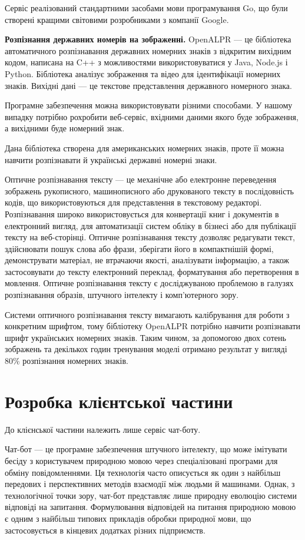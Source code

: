 Сервіс реалізований стандартними засобами мови програмування Go,
що були створені кращими світовими розробниками з компанії Google.

\textbf{Розпізнання державних номерів на зображенні.}
OpenALPR — це бібліотека автоматичного розпізнавання
державних номерних знаків з відкритим вихідним кодом,
написана на C++ з можливостями використовуватися у Java, Node.js і Python.
Бібліотека аналізує зображення та відео для ідентифікації номерних знаків.
Вихідні дані — це текстове представлення державного номерного знака.

Програмне забезпечення можна використовувати різними способами.
У нашому випадку потрібно рохробити веб-сервіс, вхідними даними якого буде зображення, а
вихідними буде номерний знак.

Дана бібліотека створена для американських номерних знаків,
проте її можна навчити розпізнавати й українські державні номерні знаки.

Оптичне розпізнавання тексту — це механічне або електронне переведення
зображень рукописного, машинописного або друкованого тексту в послідовність
кодів, що використовуються для представлення в текстовому редакторі.
Розпізнавання широко використовується для конвертації книг і документів
в електронний вигляд, для автоматизації систем обліку в бізнесі або
для публікації тексту на веб-сторінці.
Оптичне розпізнавання тексту дозволяє редагувати текст,
здійснювати пошук слова або фрази, зберігати його в компактнішій формі,
демонструвати матеріал, не втрачаючи якості,
аналізувати інформацію, а також застосовувати до тексту електронний переклад,
форматування або перетворення в мовлення.
Оптичне розпізнавання тексту є досліджуваною проблемою в галузях розпізнавання образів,
штучного інтелекту і комп'ютерного зору.

Системи оптичного розпізнавання тексту вимагають калібрування для
роботи з конкретним шрифтом, тому бібліотеку OpenALPR потрібно
навчити розпізнавати шрифт українських номерних знаків.
Таким чином, за допомогою двох сотень зображень та декількох
годин тренування моделі отримано результат у вигляді 80\%
розпізнання номерних знаків.

\section{Розробка клієнтської частини}

До клієнської частини належить лише сервіс чат-боту.

Чат-бот — це програмне забезпечення штучного інтелекту, що може імітувати бесіду з користувачем природною мовою через спеціалізовані програми для обміну повідомленнями.
Ця технологія часто описується як один з найбільш передових і перспективних
методів взаємодії між людьми й машинами.
Однак, з технологічної точки зору, чат-бот представляє лише природну
еволюцію системи відповіді на запитання.
Формулювання відповідей на питання природною мовою є одним з найбільш
типових прикладів обробки природної мови, що застосовується в кінцевих
додатках різних підприємств.

